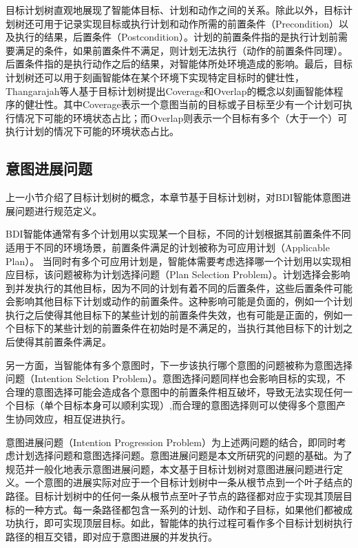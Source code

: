 目标计划树直观地展现了智能体目标、计划和动作之间的关系。除此以外，目标计划树还可用于记录实现目标或执行计划和动作所需的前置条件（Precondition）以及执行的结果，后置条件（Postcondition）。计划的前置条件指的是执行计划前需要满足的条件，如果前置条件不满足，则计划无法执行（动作的前置条件同理）。后置条件指的是执行动作之后的结果，对智能体所处环境造成的影响。最后，目标计划树还可以用于刻画智能体在某个环境下实现特定目标时的健壮性，Thangarajah等人基于目标计划树提出Coverage和Overlap的概念\cite{DBLP:conf/aamas/ThangarajahSP12}以刻画智能体程序的健壮性。其中Coverage表示一个意图当前的目标或子目标至少有一个计划可执行情况下可能的环境状态占比；而Overlap则表示一个目标有多个（大于一个）可执行计划的情况下可能的环境状态占比。

\subsection{意图进展问题}
上一小节介绍了目标计划树的概念，本章节基于目标计划树，对BDI智能体意图进展问题进行规范定义。

BDI智能体通常有多个计划用以实现某一个目标，不同的计划根据其前置条件不同适用于不同的环境场景，前置条件满足的计划被称为可应用计划（Applicable Plan）。
当同时有多个可应用计划是，智能体需要考虑选择哪一个计划用以实现相应目标，该问题被称为计划选择问题（Plan Selection Problem）。计划选择会影响到并发执行的其他目标，因为不同的计划有着不同的后置条件，这些后置条件可能会影响其他目标下计划或动作的前置条件。这种影响可能是负面的，例如一个计划执行之后使得其他目标下的某些计划的前置条件失效，也有可能是正面的，例如一个目标下的某些计划的前置条件在初始时是不满足的，当执行其他目标下的计划之后使得其前置条件满足。

另一方面，当智能体有多个意图时，下一步该执行哪个意图的问题被称为意图选择问题（Intention Selction Problem）。意图选择问题同样也会影响目标的实现，不合理的意图选择可能会造成各个意图中的前置条件相互破坏，导致无法实现任何一个目标（单个目标本身可以顺利实现）,而合理的意图选择则可以使得多个意图产生协同效应，相互促进执行。

意图进展问题（Intention Progression Problem）为上述两问题的结合，即同时考虑计划选择问题和意图选择问题。意图进展问题是本文所研究的问题的基础。为了规范并一般化地表示意图进展问题，本文基于目标计划树对意图进展问题进行定义。一个意图的进展实际对应于一个目标计划树中一条从根节点到一个叶子结点的路径。目标计划树中的任何一条从根节点至叶子节点的路径都对应于实现其顶层目标的一种方式。每一条路径都包含一系列的计划、动作和子目标，如果他们都被成功执行，即可实现顶层目标。如此，智能体的执行过程可看作多个目标计划树执行路径的相互交错，即对应于意图进展的并发执行。


